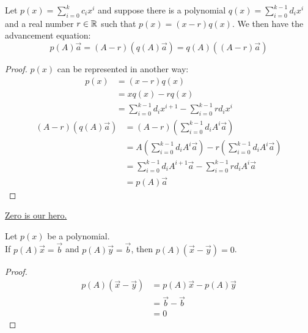 \begin{theorem}
    Let $p(x)=\sum_{i=0}^kc_ix^i$ and suppose there is a polynomial $q(x)=\sum_{i=0}^{k-1}d_ix^i$ and a real number $r \in \mathbb{R}$ such that $p(x)=(x-r)q(x)$. 
    We then have the advancement equation:
    $$p(A)\vec{a}=(A-r)(q(A)\vec{a})=q(A)((A-r)\vec{a})$$
\end{theorem}
\begin{proof}
    $p(x)$ can be represented in another way:
    \begin{equation}
        \begin{split}
            p(x) &= (x-r)q(x)\\
            &= xq(x)-rq(x)\\
            &= \sum_{i=0}^{k-1}d_ix^{i+1}-\sum_{i=0}^{k-1}rd_ix^i
        \end{split}
    \end{equation}
    \begin{equation}
        \begin{split}
            (A-r)(q(A)\vec{a}) &= (A-r)(\sum_{i=0}^{k-1}d_iA^i\vec{a})\\
            &= A(\sum_{i=0}^{k-1}d_iA^i\vec{a})-r(\sum_{i=0}^{k-1}d_iA^i\vec{a})\\
            &= \sum_{i=0}^{k-1}d_iA^{i+1}\vec{a}-\sum_{i=0}^{k-1}rd_iA^i\vec{a}\\
            &= p(A)\vec{a}
        \end{split}
    \end{equation}
\end{proof}

\noindent \underline{Zero is our hero.}

\begin{lemma}
    Let $p(x)$ be a polynomial.\\
    If $p(A)\vec{x}=\vec{b}$ and $p(A)\vec{y}=\vec{b}$, then $p(A)(\vec{x}-\vec{y})=0$.
\end{lemma}
\begin{proof}
    \begin{equation}
        \begin{split}
            p(A)(\vec{x}-\vec{y}) &= p(A)\vec{x}-p(A)\vec{y}\\
            &= \vec{b}-\vec{b}\\
            &= 0
        \end{split}
    \end{equation}
\end{proof}

